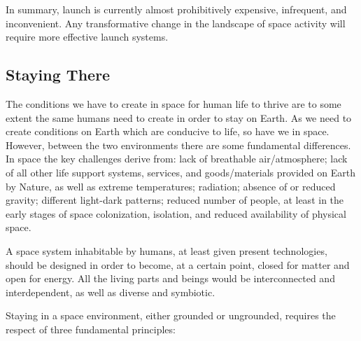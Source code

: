 \documentclass[letter,11pt]{article}
\begin{document}
In summary, launch is currently almost prohibitively expensive, infrequent, and
inconvenient. Any transformative change in the landscape of space activity will
require more effective launch systems.

\subsection{Staying There \label{staying-there}}
\label{ps-staying-there}

The conditions we have to create in space for human life to thrive are to some
extent the same humans need to create in order to stay on Earth. As we need to
create conditions on Earth which are conducive to life, so have we in space.
However, between the two environments there are some fundamental differences.
In space the key challenges derive from: lack of breathable air/atmosphere;
lack of all other life support systems, services, and goods/materials provided
on Earth by Nature, as well as extreme temperatures; radiation; absence of or
reduced gravity; different light-dark patterns; reduced number of people, at
least in the early stages of space colonization, isolation, and reduced
availability of physical space.
 
A space system inhabitable by humans, at least given present technologies,
should be designed in order to become, at a certain point, closed for matter
and open for energy. All the living parts and beings would be interconnected
and interdependent, as well as diverse and symbiotic.
 
Staying in a space environment, either grounded or ungrounded, requires the
respect of three fundamental principles: 
\end{document}
